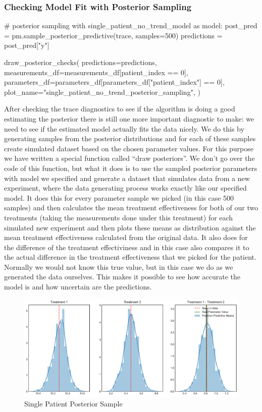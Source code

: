 \documentclass[12pt,a4paper,leqno]{report}
\theoremstyle{plain}
\theoremstyle{definition}
\theoremstyle{remark}
\begin{document}

\subsubsection{Checking Model Fit with Posterior Sampling}

\bigskip
\begin{pyverbatim}
# posterior sampling
with single_patient_no_trend_model as model:
    post_pred = pm.sample_posterior_predictive(trace, samples=500)
    predictions = post_pred["y"]

draw_posterior_checks(
    predictions=predictions,
    measurements_df=measurements_df[patient_index == 0],
    parameters_df=parameters_df[parameters_df["patient_index"] == 0],
    plot_name="single_patient_no_trend_posterior_sampling",
)
\end{pyverbatim}
\bigskip

After checking the trace diagnostics to see if the algorithm is doing a good estimating
the posterior there is still one more important diagnostic to make: we need to see if
the estimated model actually fits the data nicely. We do this by generating samples from
the posterior distributions and for each of these samples create simulated dataset based
on the chosen parameter values. For this purpose we have written a special function
called ``draw posteriors''. We don't go over the code of this function, but what it does is to use the sampled
posterior parameters with model we specified and generate a dataset that simulates data
from a new experiment, where the data generating process works exactly like our
specified model. It does this for every parameter sample we picked (in this case 500
samples) and then calculates the mean treatment effectiveness for both of our two
treatments (taking the measurements done under this treatment) for each simulated new
experiment and then plots these means as distribution against the mean treatment
effectiveness calculated from the original data. It also does for the difference of the
treatment effectiviness and in this case also compares it to the actual difference in
the treatment effectiveness that we picked for the patient. Normally we would not know
this true value, but in this case we do as we generated the data ourselves. This
makes it possible to see how accurate the model is and how uncertain are the predictions.

\begin{figure}[!h]
    \caption{Single Patient Posterior Sample}
    \includegraphics[width=\textwidth,height=\textheight,keepaspectratio]{single_patient_posterior_sampling.pdf}
\end{figure}
\end{document}
